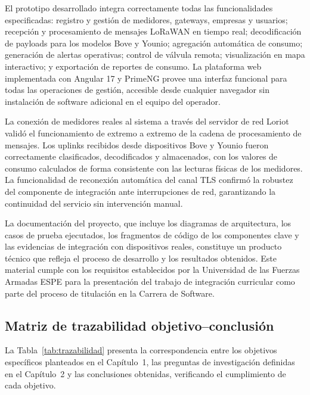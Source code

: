 \documentclass[12pt,a4paper,oneside]{report}
\begin{document}
El prototipo desarrollado integra correctamente todas las funcionalidades especificadas: registro y gestión de medidores, gateways, empresas y usuarios; recepción y procesamiento de mensajes LoRaWAN en tiempo real; decodificación de payloads para los modelos Bove y Younio; agregación automática de consumo; generación de alertas operativas; control de válvula remota; visualización en mapa interactivo; y exportación de reportes de consumo. La plataforma web implementada con Angular 17 y PrimeNG provee una interfaz funcional para todas las operaciones de gestión, accesible desde cualquier navegador sin instalación de software adicional en el equipo del operador.

La conexión de medidores reales al sistema a través del servidor de red Loriot validó el funcionamiento de extremo a extremo de la cadena de procesamiento de mensajes. Los uplinks recibidos desde dispositivos Bove y Younio fueron correctamente clasificados, decodificados y almacenados, con los valores de consumo calculados de forma consistente con las lecturas físicas de los medidores. La funcionalidad de reconexión automática del canal TLS confirmó la robustez del componente de integración ante interrupciones de red, garantizando la continuidad del servicio sin intervención manual.

La documentación del proyecto, que incluye los diagramas de arquitectura, los casos de prueba ejecutados, los fragmentos de código de los componentes clave y las evidencias de integración con dispositivos reales, constituye un producto técnico que refleja el proceso de desarrollo y los resultados obtenidos. Este material cumple con los requisitos establecidos por la Universidad de las Fuerzas Armadas ESPE para la presentación del trabajo de integración curricular como parte del proceso de titulación en la Carrera de Software.

\subsection*{Matriz de trazabilidad objetivo--conclusión}

La Tabla~\ref{tab:trazabilidad} presenta la correspondencia entre los objetivos específicos planteados en el Capítulo~1, las preguntas de investigación definidas en el Capítulo~2 y las conclusiones obtenidas, verificando el cumplimiento de cada objetivo.
\end{document}
